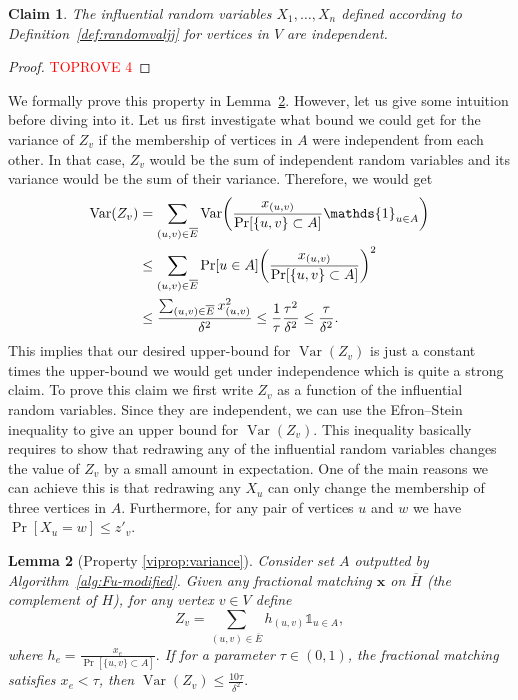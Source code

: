 \documentclass[letterpaper,11pt]{article}
\makeatletter
\DeclareMathOperator{\var}{Var}
\let\originalleft\left
\let\originalright\right
\renewcommand{\left}{\mathopen{}\mathclose\bgroup\originalleft}
\renewcommand{\right}{\aftergroup\egroup\originalright}
\newtheorem{lemma}{Lemma}[section]
\newtheorem{claim}[lemma]{Claim}
\renewcommand{\paragraph}{\@startsection{paragraph}{4}{\z@}{10pt}{-1em}{\normalfont\normalsize\bfseries}}
\makeatother
\begin{document}
\begin{claim}
    \label{obs:Fu_properties} 
 The influential random variables  $X_1, \dots, X_n$ defined according to Definition~\ref{def:randomvaljj} for vertices in $V$ are independent.
\end{claim}
\begin{proof}\textcolor{red}{TOPROVE 4}\end{proof}

\paragraph{Proof of Property \ref{viprop:variance}.} We formally prove this property in Lemma~\ref{lem:BoundedVarZv}. However, let us give some intuition before diving into it. Let us first investigate what bound we could get for the variance of $Z_v$ if the membership of vertices in $A$ were independent from each other. In that case,  $Z_v$ would be the sum of independent random variables and its variance would  be  the sum of their variance. Therefore, we would get
\begin{align*}
    \var(Z_v) &= \sum_{(u,v)\in \overline{E}}\var\left (\frac{x_{(u,v)}}{\Pr[\{u,v\}\subset A]}\mathds{1}_{u\in A}\right) \\ & \leq \sum_{(u,v)\in \overline{E}} \Pr[u\in A] \left( \frac{x_{(u,v)}}{\Pr[\{u,v\}\subset A]} \right)^2 \\ &  \leq 
    \frac{\sum_{(u,v)\in \overline{E}}x_{(u,v)}^2}{\delta^2}
      \leq 
    \frac{1}{\tau}\frac{\tau^2}{\delta^2} \leq \frac{\tau}{\delta^2}.
\end{align*}
This implies that our desired upper-bound for  $\var(Z_v)$ is just a constant times the upper-bound we would get under independence which is quite a strong claim. To prove this  claim  we first write $Z_v$ as a function of the influential random variables. Since they are independent, we can use the  Efron–Stein inequality to give an upper bound for $\var(Z_v)$. This inequality basically requires to show that redrawing any of the influential random variables changes the  value of $Z_v$ by a small amount in expectation. One of the main reasons we can achieve this  is that redrawing any  $X_u$ can only change the membership of three vertices in $A$. Furthermore, for any pair of vertices $u$ and $w$ we have $\Pr[X_u=w] \leq z'_v$.
 




\begin{lemma} [Property \ref{viprop:variance}]\label{lem:BoundedVarZv}
Consider set $A$ outputted by  Algorithm~\ref{alg:Fu-modified}. Given any fractional matching $\bm{x}$ on $\overline{H}$ (the complement of  $H$), for any vertex  $v\in V$ define  $$Z_v = \sum_{(u,v) \in  \overline{E}} h_{(u,v)}\mathds{1}_{u\in A},$$ where $h_{e}=\frac{x_e}{\Pr[\{u,v\}\subset A]}.$ If for a parameter $\tau\in (0,1)$, the fractional matching satisfies $x_e<\tau$, then $\var(Z_v)\leq \frac{10\tau}{\delta^2}.$
\end{lemma}
\end{document}

